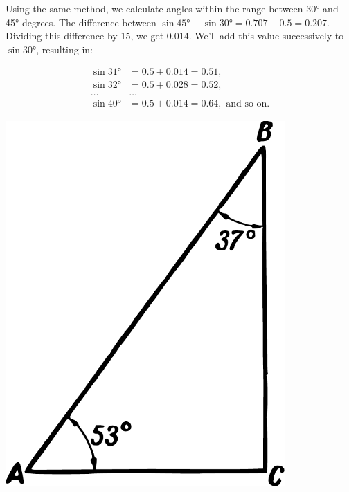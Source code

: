 Using the same method, we calculate angles within the range between \ang{30} and \ang{45} degrees. The difference between $\sin \ang{45} - \sin \ang{30} = 0.707 - 0.5 = 0.207$. Dividing this difference by 15, we get 0.014. We'll add this value successively to $\sin \ang{30}$, resulting in:
\begin{small}
\begin{align*}%
\sin \ang{31}  & = 0.5 + 0.014 = 0.51,\\
\sin \ang{32}  & = 0.5 + 0.028 = 0.52,\\
\ldots & \ldots \\
\sin \ang{40}  & = 0.5 + 0.014 = 0.64,\,\,\text{and so on.}
\end{align*}
\end{small}
\begin{marginfigure}[2cm]
\centering
\includegraphics[width=0.8\textwidth]{figures/ch-05/fig-090.pdf}
\end{marginfigure}
